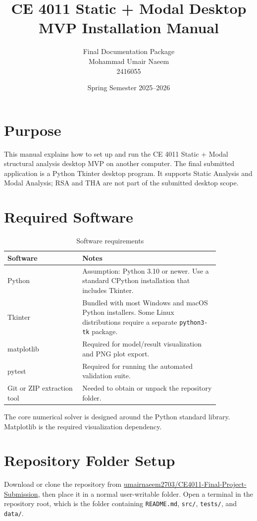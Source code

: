 \documentclass[11pt,a4paper]{article}
\title{\textbf{CE 4011 Static + Modal Desktop MVP Installation Manual}}
\author{Final Documentation Package\\[0.5em]Mohammad Umair Naeem\\2416055}
\date{Spring Semester 2025--2026}
\begin{document}
\maketitle

\section{Purpose}

This manual explains how to set up and run the CE 4011 Static + Modal structural analysis desktop MVP on another computer. The final submitted application is a Python Tkinter desktop program. It supports Static Analysis and Modal Analysis; RSA and THA are not part of the submitted desktop scope.

\section{Required Software}

\begin{table}[htbp]
\centering
\caption{Software requirements}
\begin{tabular}{p{0.3\linewidth}p{0.55\linewidth}}
\toprule
Software & Notes \\
\midrule
Python & Assumption: Python 3.10 or newer. Use a standard CPython installation that includes Tkinter. \\
Tkinter & Bundled with most Windows and macOS Python installers. Some Linux distributions require a separate \texttt{python3-tk} package. \\
matplotlib & Required for model/result visualization and PNG plot export. \\
pytest & Required for running the automated validation suite. \\
Git or ZIP extraction tool & Needed to obtain or unpack the repository folder. \\
\bottomrule
\end{tabular}
\end{table}

The core numerical solver is designed around the Python standard library. Matplotlib is the required visualization dependency.

\section{Repository Folder Setup}

Download or clone the repository from \href{https://github.com/umairnaeem2703/CE4011-Final-Project-Submission}{umairnaeem2703/CE4011-Final-Project-Submission}, then place it in a normal user-writable folder. Open a terminal in the repository root, which is the folder containing \texttt{README.md}, \texttt{src/}, \texttt{tests/}, and \texttt{data/}.
\end{document}
